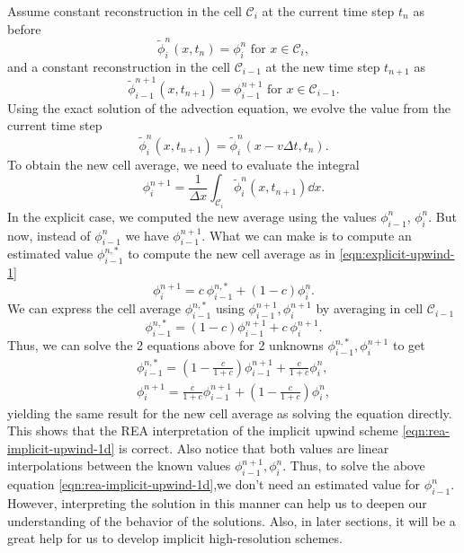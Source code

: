\documentclass[../thesis.tex]{subfiles}
\begin{document}
Assume constant reconstruction in the cell \(\mathcal{C}_i\) at the current time step \(t_n\)
as before
\[
    \tilde{\phi}_{i}^{n}(x,t_n) = \phi_{i}^{n} \text{ for } x \in \mathcal{C}_i,
\]
and a constant reconstruction in the cell \(\mathcal{C}_{i-1}\) at the new time step \(t_{n+1}\)
as
\[
    \tilde{\phi}_{i-1}^{n+1}(x,t_{n+1}) = \phi_{i-1}^{n+1}
    \text{ for } x \in \mathcal{C}_{i-1}.
\]
Using the exact solution of the advection equation, we evolve the value from the current time step
\[
    \tilde{\phi}_{i}^{n}(x,t_{n+1}) = \tilde{\phi}_{i}^{n}(x - v\Delta t,t_{n}).
\]
To obtain the new cell average, we need to evaluate the integral
\[\phi_{i}^{n+1} =\frac{1}{\Delta x}\int_{\mathcal{C}_{i}}\tilde{\phi}_{i}^{n}(x,t_{n+1}) \dd{x}.\]
In the explicit case, we computed the new average using the values \(\phi_{i-1}^{n}\),
\(\phi_{i}^{n}\). But now, instead of \(\phi_{i-1}^{n}\) we have \(\phi_{i-1}^{n+1}\).
What we can make is to compute an estimated value \(\phi_{i-1}^{n,*}\) to compute
the new cell average as in \eqref{eqn:explicit-upwind-1}
\begin{equation}
    \phi_{i}^{n+1}
    = c~\phi_{i-1}^{n,*}
    + \left( 1 - c \right)\phi_{i}^{n}.
\end{equation}
We can express the cell average \(\phi_{i-1}^{n,*}\) using \(\phi_{i-1}^{n+1}, \phi_{i}^{n+1}\) by averaging in cell \(\mathcal{C}_{i-1}\)
\begin{equation}
    \phi_{i-1}^{n,*}
    = \left( 1-c \right)\phi_{i-1}^{n+1}
    + c~\phi_{i}^{n+1}.
\end{equation}
Thus, we can solve the 2 equations above for 2 unknowns \(\phi_{i-1}^{n,*}, \phi_{i}^{n+1}\) to get
\begin{equation*}
    \begin{split}
        \phi_{i-1}^{n,*}
        = \left( 1 - \frac{c}{1+c} \right)\phi_{i-1}^{n+1}
        + \frac{c}{1+c}\phi_{i}^{n},
        \\
        \phi_{i}^{n+1}
        = \frac{c}{1+c}\phi_{i-1}^{n+1}
        + \left( 1 - \frac{c}{1+c} \right)\phi_{i}^{n},
    \end{split}
\end{equation*}
yielding the same result for the new cell average as solving the equation
directly. This shows that the REA interpretation of the implicit upwind scheme \eqref{eqn:rea-implicit-upwind-1d} is correct.
Also notice that both values are linear interpolations between the known values
\(\phi_{i-1}^{n+1}, \phi_{i}^{n}\). Thus, to solve the above equation \eqref{eqn:rea-implicit-upwind-1d},we don't need an estimated value for \(\phi_{i-1}^{n}\).
However, interpreting the solution in this manner can help us to deepen our understanding of the behavior of the solutions. Also, in later sections, it will be a great help for us to develop implicit high-resolution schemes.
\end{document}
